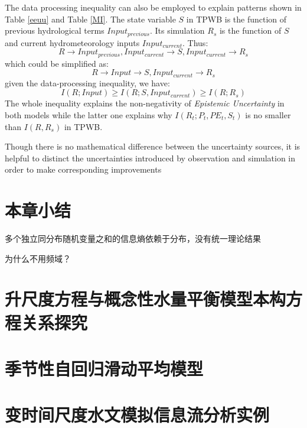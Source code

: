 The data processing inequality can also be employed to explain patterns shown in Table \ref{eeuu} and Table \ref{MI}. The state variable $S$ in TPWB is the function of previous hydrological terms $Input_{previous}$. Its simulation $R_s$ is the function of $S$ and current hydrometeorology inputs $Input_{current}$. Thus:
\begin{equation}
R \rightarrow Input_{previous},Input_{current} \rightarrow S,Input_{current} \rightarrow R_s
\end{equation}
which could be simplified  as:
 \begin{equation}
R \rightarrow Input \rightarrow S,Input_{current} \rightarrow R_s
\end{equation}
given the data-processing inequality, we have:
\begin{equation}
\label{ie2}
I(R;Input)\geq I(R;S,Input_{current}) \geq I(R;R_s)
\end{equation}
The whole inequality explains the non-negativity of \emph{Epistemic Uncertainty} in both models while the latter one explains why $I(R_t;P_t,PE_t,S_t)$ is no smaller than $I(R,R_s)$ in TPWB.

Though there is no mathematical difference between the uncertainty sources, it is helpful to distinct the uncertainties introduced by observation and simulation in order to make corresponding improvements






\section{本章小结}

多个独立同分布随机变量之和的信息熵依赖于分布，没有统一理论结果

为什么不用频域？

\fi





\iffalse
\section{升尺度方程与概念性水量平衡模型本构方程关系探究}

\section{季节性自回归滑动平均模型}
\section{变时间尺度水文模拟信息流分析实例}

